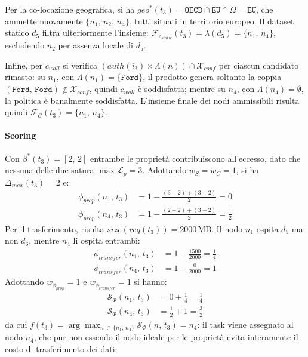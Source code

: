 Per la co-locazione geografica, si ha $geo^*(t_3) = \mathtt{OECD} \cap \mathtt{EU} \cap \Omega = \mathtt{EU}$, che ammette nuovamente $\{n_1,\, n_2,\, n_4\}$, tutti situati in territorio europeo. Il dataset statico $d_5$ filtra ulteriormente l'insieme: $\mathcal{F}_{c_{static}}(t_3) = \lambda(d_5) = \{n_1,\, n_4\}$, escludendo $n_2$ per assenza locale di $d_5$. 

Infine, per $c_{wall}$ si verifica $(auth(i_3) \times \Lambda(n)) \cap \mathcal{X}_{conf}$ per ciascun candidato rimasto: su $n_1$, con $\Lambda(n_1) = \{\mathtt{Ford}\}$, il prodotto genera soltanto la coppia $(\mathtt{Ford},\,\mathtt{Ford}) \notin \mathcal{X}_{conf}$, quindi $c_{wall}$ è soddisfatta; mentre su $n_4$, con $\Lambda(n_4) = \emptyset$, la politica è banalmente soddisfatta. L'insieme finale dei nodi ammissibili risulta quindi $\mathcal{F_C}(t_3) = \{n_1,\, n_4\}$.

\paragraph{Scoring} Con $\beta^*(t_3) = [2,\,2]$ entrambe le proprietà contribuiscono all'eccesso, dato che nessuna delle due satura $\max \mathcal{L}_p = 3$. Adottando $w_S = w_C = 1$, si ha $\Delta_{max}(t_3) = 2$ e:
\begin{align}
    \phi_{prop}(n_1,\, t_3) &= 1 - \frac{(3-2) + (3-2)}{2} = 0 \\
    \phi_{prop}(n_4,\, t_3) &= 1 - \frac{(2-2) + (3-2)}{2} = \frac{1}{2}
\end{align}
Per il trasferimento, risulta $size(req(t_3)) = 2000\,\text{MB}$. Il nodo $n_1$ ospita $d_5$ ma non $d_6$, mentre $n_4$ li ospita entrambi:
\begin{align}
    \phi_{transfer}(n_1,\, t_3) &= 1 - \frac{1500}{2000} = \frac{1}{4} \\
    \phi_{transfer}(n_4,\, t_3) &= 1 - \frac{0}{2000} = 1
\end{align}
Adottando $w_{\phi_{prop}} = 1$ e $w_{\phi_{transfer}} = 1$ si hanno:
\begin{align}
    \mathcal{S}_\Phi(n_1,\, t_3) &= 0 + \frac{1}{4} = \frac{1}{4} \\
    \mathcal{S}_\Phi(n_4,\, t_3) &= \frac{1}{2} + 1 = \frac{3}{2}
\end{align}
da cui $f(t_3) = \arg\max_{n \,\in\, \{n_1,\,n_4\}} \mathcal{S}_\Phi(n,\,t_3) = n_4$: il task viene assegnato al nodo $n_4$, che pur non essendo il nodo ideale per le proprietà evita interamente il costo di trasferimento dei dati.

